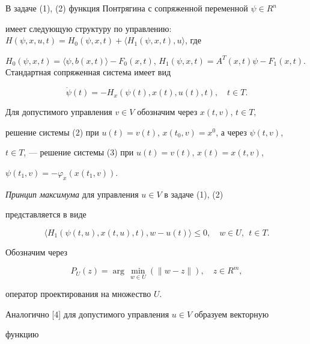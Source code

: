 В задаче (1), (2) функция Понтрягина с сопряженной переменной $\psi\in{R^n}$


имеет следующую структуру по управлению: $H(\psi,x,u,t)=H_{0}(\psi,x,t)+


\langle{H_1}(\psi,x,t),u\rangle$, где


$H_{0}(\psi,x,t)=\langle\psi,b(x,t)\rangle-F_{0}(x,t)$, $H_{1}(\psi,x,t)


=A^{T}(x,t)\psi-F_{1}(x,t)$. Стандартная сопряженная система имеет вид


\begin{equation}


\Dot{\psi}(t)=-H_{x}(\psi(t),x(t),u(t),t),\quad{t}\in{T}.


\end{equation}





Для допустимого управления $v\in{V}$ обозначим через $x(t,v)$, $t\in{T}$, 


решение системы (2) при $u(t)=v(t)$, $x(t_0,v)=x^0$, а через $\psi(t,v)$,


$t\in{T}$, --- решение системы (3) при $u(t)=v(t)$, $x(t)=x(t,v)$,


$\psi(t_1,v)=-\varphi_x(x(t_1,v))$.





{\it Принцип максимума} для управления $u\in{V}$ в задаче (1), (2)


представляется в виде


\begin{equation}


\langle{H}_{1}(\psi(t,u),x(t,u),t),w-u(t)\rangle\leq{0},


\quad{w}\in{U},\ \ t\in{T}.


\end{equation}





Обозначим через 


$$


P_{U}(z)=\arg\,\min\limits_{w\in{U}}(\|w-z\|),\quad{z}\in{R^m},


$$


оператор проектирования на множество $U$.





Аналогично [4] для допустимого управления $u\in{V}$ образуем векторную


функцию


